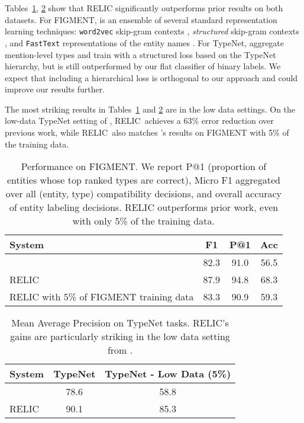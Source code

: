 \documentclass{article} \usepackage{iclr2020_conference,times}
\newcommand{\ack}{RELIC\xspace}
\begin{document}
Tables~\ref{tab:figment_results}, \ref{tab:typenet_results} show that \ack significantly outperforms prior results on both datasets.
For FIGMENT, \citet{yaghoobzadeh2018corpus} is an ensemble of several standard representation learning techniques: \texttt{word2vec} skip-gram contexts \citep{mikolov2013distributed}, \emph{structured} skip-gram contexts \citep{ling2015two}, and \texttt{FastText} representations of the entity names \citep{bojanowski2017enriching}.
For TypeNet, \citet{murty2018hierarchical} aggregate mention-level types and train with a structured loss based on the TypeNet hierarchy, but is still outperformed by our flat classifier of binary labels. We expect that including a hierarchical loss is orthogonal to our approach and could improve our results further.

The most striking results in Tables~\ref{tab:figment_results} and \ref{tab:typenet_results} are in the low data settings. 
On the low-data TypeNet setting of \citet{murty2018hierarchical}, \ack~achieves a 63\% error reduction over previous work, while \ack~also matches \citealt{yaghoobzadeh2018corpus}'s results on FIGMENT with 5\% of the training data.
\begin{table}[]
    \centering
    \begin{tabular}{|l|c|c|c|}
    \hline
        System & F1 & P@1 & Acc \\ \hline
        \citealt{yaghoobzadeh2018corpus} &  82.3 & 91.0 & 56.5 \\
        \ack & 87.9 & 94.8 & 68.3 \\
        \ack with 5\% of FIGMENT training data & 83.3 & 90.9 & 59.3 \\ \hline
    \end{tabular}
    \caption{Performance on FIGMENT. We report P@1 (proportion of entities whose top ranked types are correct), Micro F1 aggregated over all (entity, type) compatibility decisions, and overall accuracy of entity labeling decisions. \ack outperforms prior work, even with only 5\% of the training data.}
    \label{tab:figment_results}
\end{table}

\begin{table}[]
    \centering
    \begin{tabular}{|l|c|c|}
    \hline
    System & TypeNet & TypeNet - Low Data (5\%) \\\hline
    \citealt{murty2018hierarchical} & 78.6 & 58.8 \\
    \ack & 90.1 & 85.3 \\\hline
    \end{tabular}
    \caption{Mean Average Precision on TypeNet tasks. \ack's gains are particularly striking in the low data setting from \cite{murty2018hierarchical}.}
    \label{tab:typenet_results}
\end{table}
\end{document}

